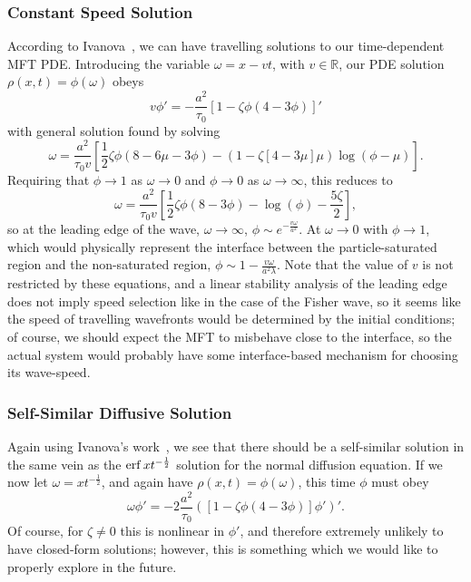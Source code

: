 \subsubsection{Constant Speed Solution}
According to Ivanova~\cite{ivanova2007}, we can have travelling solutions to our time-dependent MFT PDE. Introducing the variable $\omega = x - vt$, with $v\in \mathbb{R}$, our PDE solution $\rho(x, t) = \phi(\omega)$ obeys
\begin{equation}
 v \phi ' = -\frac{a^2}{\tau_0} \left[ 1-\zeta \phi \left(4-3\phi\right) \right] '
\end{equation}
with general solution found by solving
\begin{equation}
 \omega = \frac{a^2}{\tau_0 v} \left[ \frac{1}{2} \zeta \phi \left(8-6\mu-3\phi\right) - \left(1-\zeta\left[4-3\mu\right]\mu\right) \log{\left(\phi-\mu\right)} \right].
\end{equation}
Requiring that $\phi \rightarrow  1$ as $\omega \rightarrow 0$ and $\phi \rightarrow 0$ as $\omega \rightarrow \infty$, this reduces to
\begin{equation}
 \omega = \frac{a^2}{\tau_0 v} \left[ \frac{1}{2} \zeta \phi \left(8-3\phi\right) - \log{\left(\phi\right)} - \frac{5 \zeta}{2} \right],
\end{equation}
so at the leading edge of the wave, $\omega \rightarrow \infty$, $\phi \sim e^{-\frac{v \omega}{a^2}} $. At $\omega \rightarrow 0$ with $\phi \rightarrow 1$, which would physically represent the interface between the particle-saturated
region and the non-saturated region, $\phi \sim 1 - \frac{v \omega}{a^2 \lambda}$. Note that the value of $v$ is not restricted by these equations, and a linear stability analysis of the leading edge does not imply speed selection like in
the case of the Fisher wave\cite{sherratt1998transition}, so it seems like the speed of travelling wavefronts would be determined by the initial conditions; of course, we should expect the MFT to misbehave close to the interface,
so the actual system would probably have some interface-based mechanism for choosing its wave-speed.
\subsubsection{Self-Similar Diffusive Solution}
Again using Ivanova's work~\cite{ivanova2007}, we see that there should be a self-similar solution in the same vein as the $\operatorname{erf}{x t^{-\frac{1}{2}}}$ solution for the normal diffusion equation. If we now let $\omega = x t^{-\frac{1}{2}}$, and
again have $\rho(x, t) = \phi(\omega)$, this time $\phi$ must obey
\begin{equation}
 \omega \phi ' = -2\frac{a^2}{\tau_0}\left( \left[ 1-\zeta \phi (4 - 3 \phi) \right] \phi ' \right) ' .
\end{equation}
Of course, for $\zeta \neq 0$ this is nonlinear in $\phi '$, and therefore extremely unlikely to have closed-form solutions; however, this is something which we would like to properly explore in the future.